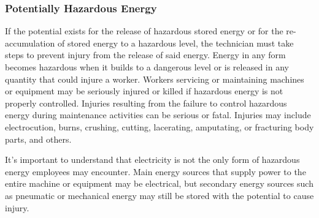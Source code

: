 \documentclass[11pt,a4paper]{article}
\begin{document}
\subsubsection{Potentially Hazardous Energy}
If the potential exists for the release of hazardous stored energy or for the re-accumulation of stored energy to a hazardous level, the technician must take steps to prevent injury from the release of said energy. Energy in any form becomes hazardous when it builds to a dangerous level or is released in any quantity that could injure a worker. Workers servicing or maintaining machines or equipment may be seriously injured or killed if hazardous energy is not properly controlled. Injuries resulting from the failure to control hazardous energy during maintenance activities can be serious or fatal. Injuries may include electrocution, burns, crushing, cutting, lacerating, amputating, or fracturing body parts, and others.

It's important to understand that electricity is not the only form of hazardous energy employees may encounter. Main energy sources that supply power to the entire machine or equipment may be electrical, but secondary energy sources such as pneumatic or mechanical energy may still be stored with the potential to cause injury.
\end{document}
